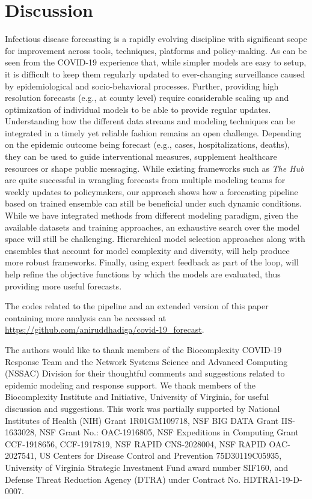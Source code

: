 \documentclass[sigconf]{acmart}
\newcommand{\hub}{\emph{The Hub}}
\begin{document}
\section{Discussion}
Infectious disease forecasting is a rapidly evolving discipline with significant scope for improvement across tools, techniques, platforms and policy-making. As can be seen from the COVID-19 experience that, while simpler models are easy to setup, it is difficult to keep them regularly updated to ever-changing surveillance caused by epidemiological and socio-behavioral processes. Further, providing high resolution forecasts (e.g., at county level) require considerable scaling up and optimization of individual models to be able to provide regular updates. Understanding how the different data streams and modeling techniques can be integrated in a timely yet reliable fashion remains an open challenge. Depending on the epidemic outcome being forecast (e.g., cases, hospitalizations, deaths), they can be used to guide interventional measures, supplement healthcare resources or shape public messaging. While existing frameworks such as \hub{} are quite successful in wrangling forecasts from multiple modeling teams for weekly updates to policymakers, our approach shows how a forecasting pipeline based on trained ensemble can still be beneficial under such dynamic conditions. While we have integrated methods from different modeling paradigm, given the available datasets and training approaches, an exhaustive search over the model space will still be challenging. Hierarchical model selection approaches along with ensembles that account for model complexity and diversity, will help produce more robust frameworks. Finally, using expert feedback as part of the loop, will help refine the objective functions by which the models are evaluated, thus providing more useful forecasts. 

The codes related to the pipeline and an extended version of this paper containing more analysis can be accessed at \url{https://github.com/aniruddhadiga/covid-19_forecast}.

\begin{acks}
The authors would like to thank members of the Biocomplexity COVID-19 Response Team and the Network Systems Science and Advanced Computing (NSSAC) Division for their thoughtful comments and suggestions related to epidemic modeling and response support. We thank members of the Biocomplexity Institute and Initiative, University of Virginia, for useful discussion and suggestions. This work was partially supported by National Institutes of Health (NIH) Grant 1R01GM109718, NSF BIG DATA Grant IIS-1633028, NSF Grant No.: OAC-1916805, NSF Expeditions in Computing Grant CCF-1918656, CCF-1917819, NSF RAPID CNS-2028004, NSF RAPID OAC-2027541, US Centers for Disease Control and Prevention 75D30119C05935, University of Virginia Strategic Investment Fund award number SIF160, and Defense Threat Reduction Agency (DTRA) under Contract No. HDTRA1-19-D-0007.
\end{acks}





\end{document}
